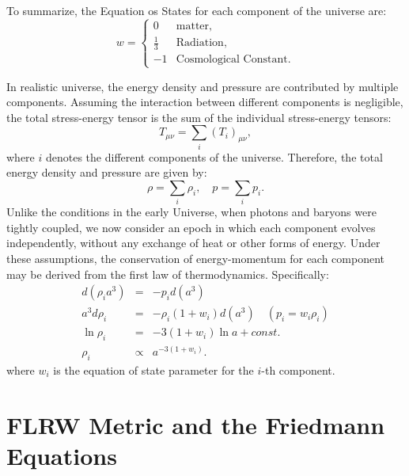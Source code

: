 To summarize, the Equation os States for each component of the universe are:
\begin{equation}
    w = 
    \begin{cases}
        0 & \text{matter}, \\
        \frac{1}{3} & \text{Radiation}, \\
        -1 & \text{Cosmological Constant}.
    \end{cases}
    \label{eq:equation_of_state_summary}
\end{equation}

In realistic universe, the energy density and pressure are contributed by multiple components. Assuming the interaction between different components is negligible, the total stress-energy tensor is the sum of the individual stress-energy tensors:
\begin{equation}
    T_{\mu\nu} = \sum_i (T_{i})_{\mu\nu},
\end{equation}
where \( i \) denotes the different components of the universe. Therefore, the total energy density and pressure are given by:
\begin{equation}
    \rho = \sum_i \rho_i, \quad p = \sum_i p_i.
\end{equation}
Unlike the conditions in the early Universe, when photons and baryons were tightly coupled, we now consider an epoch in which each component evolves independently, without any exchange of heat or other forms of energy. Under these assumptions, the conservation of energy-momentum for each component may be derived from the first law of thermodynamics. Specifically:
\begin{eqnarray}
    d\left(\rho_i a^3\right) &=& -p_i d(a^3) \nonumber \\
    a^3 d\rho_i &=& -\rho_i (1 + w_i) d(a^3) \quad (p_i = w_i \rho_i) \nonumber \\
    \ln \rho_i &=& -3(1 + w_i) \ln a + const. \nonumber \\
    \rho_i &\propto& a^{-3(1 + w_i)}.
    \label{eq:energy_density_scaling}
\end{eqnarray}
where \( w_i \) is the equation of state parameter for the \( i \)-th component. 

\section{FLRW Metric and the Friedmann Equations}\label{sec:flrw_metric}
